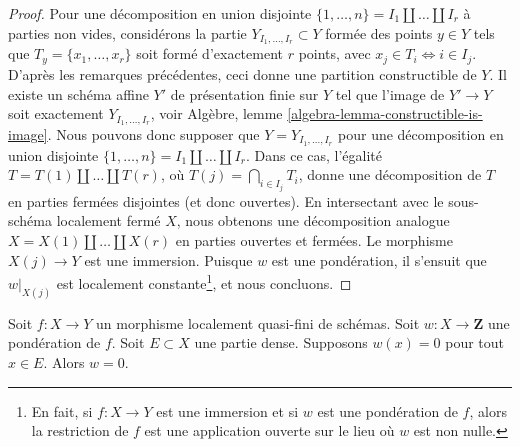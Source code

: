 \begin{proof}
\medskip\noindent
Pour une décomposition en union disjointe
$\{1, \ldots, n\} = I_1 \amalg \ldots \amalg I_r$ à parties non vides,
considérons la partie $Y_{I_1, \ldots, I_r} \subset Y$
formée des points $y \in Y$ tels que $T_y = \{x_1, \ldots, x_r\}$
soit formé d'exactement $r$ points, avec $x_j \in T_i \Leftrightarrow i \in I_j$.
D'après les remarques précédentes, ceci donne une partition constructible de $Y$.
Il existe un schéma affine $Y'$ de présentation finie
sur $Y$ tel que l'image de $Y' \to Y$ soit exactement
$Y_{I_1, \ldots, I_r}$, voir Algèbre, lemme
\ref{algebra-lemma-constructible-is-image}.
Nous pouvons donc supposer que $Y = Y_{I_1, \ldots, I_r}$ pour une
décomposition en union disjointe
$\{1, \ldots, n\} = I_1 \amalg \ldots \amalg I_r$.
Dans ce cas, l'égalité $T = T(1) \amalg \ldots \amalg T(r)$, où
$T(j) = \bigcap_{i \in I_j} T_i$,
donne une décomposition de $T$ en parties fermées disjointes (et donc ouvertes).
En intersectant avec le sous-schéma localement fermé $X$, nous obtenons une
décomposition analogue $X = X(1) \amalg \ldots \amalg X(r)$ en parties ouvertes et fermées.
Le morphisme $X(j) \to Y$ est une immersion.
Puisque $w$ est une pondération, il s'ensuit que $w|_{X(j)}$
est localement constante\footnote{En fait, si $f : X \to Y$ est une
immersion et si $w$ est une pondération de $f$, alors la restriction de $f$ est une
application ouverte sur le lieu où $w$ est non nulle.}, et nous concluons.
\end{proof}

\begin{lemma}
\label{lemma-weighting-on-dense-set}
Soit $f : X \to Y$ un morphisme localement quasi-fini de schémas.
Soit $w : X \to \mathbf{Z}$ une pondération de $f$.
Soit $E \subset X$ une partie dense.
Supposons $w(x) = 0$ pour tout $x \in E$. Alors $w = 0$.
\end{lemma}

